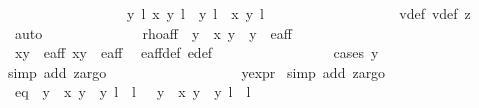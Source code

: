 \begin{isabellebody}
\ \ \ \ \ \ \ \ \ \ \ \ \ \ \ \ {\isacharbraceleft}{\isacharparenleft}{\isacharparenleft}{\isacharparenleft}{}{\isacharcomma}\ y{\isacharparenright}{\isacharcomma}\ l{\isacharparenright}{\isacharcomma}\ {\isacharparenleft}x{\isacharprime}{\isacharcomma}\ y{\isacharprime}{\isacharparenright}{\isacharcomma}\ l{\isacharprime}{\isacharparenright}{\isacharcomma}\ {\isacharparenleft}{\isacharparenleft}{\isacharparenleft}{}{\isacharcomma}\ y{\isacharparenright}{\isacharcomma}\ l{\isacharparenright}{\isacharcomma}\ {\isasymtau}\ {\isacharparenleft}x{\isacharprime}{\isacharcomma}\ y{\isacharprime}{\isacharparenright}{\isacharcomma}\ l{\isacharprime}\ {\isacharplus}\ {}{\isacharparenright}{\isacharbraceright}{\isachardoublequoteclose}\ \isanewline
\ \ \ \ \ \ \ \ \ \ \ \ \ \ \isamarkupfalse%
\ v{}{\isacharunderscore}def\ v{}{\isacharunderscore}def\ z{}\ \isamarkupfalse%
\ auto\isanewline
\ \ \ \ \ \ \ \ \ \ \ \ \isamarkupfalse%
\ rho{\isacharunderscore}aff{\isacharcolon}\ {\isachardoublequoteopen}{\isasymrho}\ {\isacharparenleft}y\ {\isacharasterisk}\ x{\isacharprime}{\isacharcomma}\ y\ {\isacharasterisk}\ y{\isacharprime}{\isacharparenright}\ {\isasymin}\ e{\isacharunderscore}aff{\isachardoublequoteclose}\isanewline
\ \ \ \ \ \ \ \ \ \ \ \ \ \ \ \ \isamarkupfalse%
\ {\isacartoucheopen}{\isacharparenleft}x{\isacharcomma}y{\isacharparenright}\ {\isasymin}\ e{\isacharunderscore}aff{\isacartoucheclose}\ {\isacartoucheopen}{\isacharparenleft}x{\isacharprime}{\isacharcomma}y{\isacharprime}{\isacharparenright}\ {\isasymin}\ e{\isacharunderscore}aff{\isacartoucheclose}\ \isamarkupfalse%
\ e{\isacharunderscore}aff{\isacharunderscore}def\ e{\isacharprime}{\isacharunderscore}def\isanewline
\ \ \ \ \ \ \ \ \ \ \ \ \ \ \ \ \isamarkupfalse%
{\isacharparenleft}cases\ {\isachardoublequoteopen}y\ {\isacharequal}\ {}{\isachardoublequoteclose}{\isacharparenright}\isanewline
\ \ \ \ \ \ \ \ \ \ \ \ \ \ \ \ \isamarkupfalse%
{\isacharparenleft}simp\ add{\isacharcolon}\ z{}{\isacharcomma}argo{\isacharparenright}\ \isanewline
\ \ \ \ \ \ \ \ \ \ \ \ \ \ \ \ \isamarkupfalse%
\ y{\isacharunderscore}expr\ \isamarkupfalse%
{\isacharparenleft}simp\ add{\isacharcolon}\ z{}{\isacharcomma}argo{\isacharparenright}\ \isanewline
\ \ \ \ \ \ \ \ \ \ \ \ \isamarkupfalse%
\ eq{\isacharcolon}\ {\isachardoublequoteopen}{\isacharbraceleft}{\isacharparenleft}{\isasymrho}\ {\isacharparenleft}y\ {\isacharasterisk}\ x{\isacharprime}{\isacharcomma}\ y\ {\isacharasterisk}\ y{\isacharprime}{\isacharparenright}{\isacharcomma}\ l\ {\isacharplus}\ l{\isacharprime}{\isacharparenright}{\isacharcomma}\ {\isacharparenleft}{\isasymtau}\ {\isacharparenleft}{\isasymrho}\ {\isacharparenleft}y\ {\isacharasterisk}\ x{\isacharprime}{\isacharcomma}\ y\ {\isacharasterisk}\ y{\isacharprime}{\isacharparenright}{\isacharparenright}{\isacharcomma}\ l\ {\isacharplus}\ l{\isacharprime}\ {\isacharplus}\ {}{\isacharparenright}{\isacharbraceright}\isanewline

\end{isabellebody}
